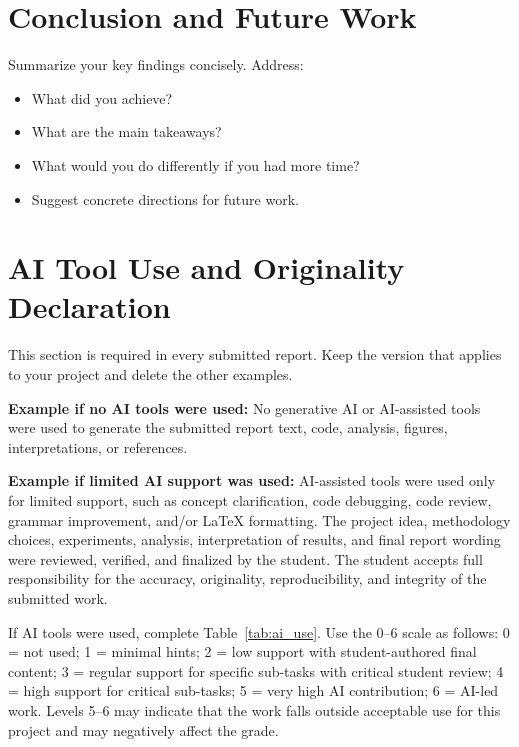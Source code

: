 \documentclass[conference]{IEEEtran}
\begin{document}
	\section{Conclusion and Future Work}
	\label{sec:conclusion}
	
	Summarize your key findings concisely. Address:
	\begin{itemize}
		\item What did you achieve?
		\item What are the main takeaways?
		\item What would you do differently if you had more time?
		\item Suggest concrete directions for future work.
	\end{itemize}
	

	\section*{AI Tool Use and Originality Declaration}
	\label{sec:ai_declaration}
	
	This section is required in every submitted report. Keep the version that applies to your project and delete the other examples.
	
	\textbf{Example if no AI tools were used:} No generative AI or AI-assisted tools were used to generate the submitted report text, code, analysis, figures, interpretations, or references.
	
	\textbf{Example if limited AI support was used:} AI-assisted tools were used only for limited support, such as concept clarification, code debugging, code review, grammar improvement, and/or LaTeX formatting. The project idea, methodology choices, experiments, analysis, interpretation of results, and final report wording were reviewed, verified, and finalized by the student. The student accepts full responsibility for the accuracy, originality, reproducibility, and integrity of the submitted work.
	
	If AI tools were used, complete Table~\ref{tab:ai_use}. Use the 0--6 scale as follows: 0 = not used; 1 = minimal hints; 2 = low support with student-authored final content; 3 = regular support for specific sub-tasks with critical student review; 4 = high support for critical sub-tasks; 5 = very high AI contribution; 6 = AI-led work. Levels 5--6 may indicate that the work falls outside acceptable use for this project and may negatively affect the grade.
	
\end{document}
